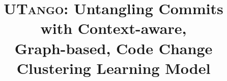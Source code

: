 \documentclass[sigconf,screen]{acmart}
\newcommand{\tool}{\textsc{UTango}\xspace}
\begin{document}

\title[Untangling Commits with Context-aware, Graph-based, Code Change Clustering Learning Model]{{\tool}: Untangling Commits with Context-aware,\\ Graph-based, Code Change Clustering Learning Model}








\end{document}
